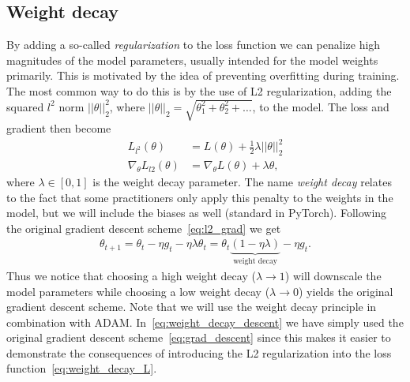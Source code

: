 \subsection{Weight decay}
By adding a so-called \textit{regularization} to the loss function we can penalize high magnitudes of the model parameters, usually intended for the model weights primarily. This is motivated by the idea of preventing overfitting during training. The most common way to do this is by the use of L2 regularization, adding the squared $l^2$ norm $||\theta||_2^2$, where $||\theta||_2 = \sqrt{\theta_1^2 + \theta_2^2 + \ldots}$, to the model. The loss and gradient then become
\begin{align}
  L_{l^2}(\theta) &= L(\theta) + \frac{1}{2}\lambda ||\theta||^2_2 \label{eq:weight_decay_L} \\
  \nabla_\theta L_{l2}(\theta) &=  \nabla_\theta L(\theta) + \lambda \theta,
  \label{eq:l2_grad}
\end{align}
where $\lambda\in [0,1]$ is the weight decay parameter. The name \textit{weight decay} relates to the fact that some practitioners only apply this penalty to the weights in the model, but we will include the biases as well (standard in PyTorch). Following the original gradient descent scheme~\cref{eq:l2_grad} we get
\begin{align}
  \theta_{t+1} = \theta_t - \eta g_t - \eta\lambda \theta_t = \theta_t\underbrace{(1-\eta\lambda)}_{\text{weight decay}} - \eta g_t. \label{eq:weight_decay_descent}
\end{align}
Thus we notice that choosing a high weight decay ($\lambda \to 1$) will downscale the model parameters while choosing a low weight decay ($\lambda \to 0$) yields the original gradient descent scheme. Note that we will use the weight decay principle in combination with ADAM. In~\cref{eq:weight_decay_descent} we have simply used the original gradient descent scheme~\cref{eq:grad_descent} since this makes it easier to demonstrate the consequences of introducing the L2 regularization into the loss function~\cref{eq:weight_decay_L}.


